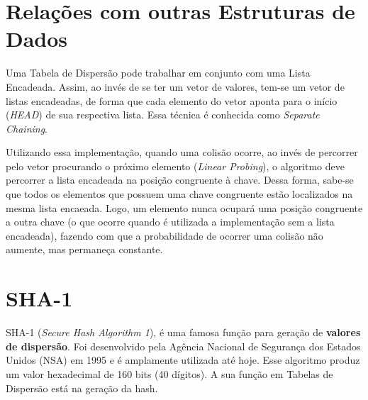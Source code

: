\documentclass[12pt,openright,oneside,a4paper,english,brazil]{abntex2}
\begin{document}
\section*{Relações com outras Estruturas de Dados}
    Uma Tabela de Dispersão pode trabalhar em conjunto com uma Lista Encadeada. Assim, ao invés de se ter um vetor de valores, tem-se um vetor de listas encadeadas, de forma que cada elemento do vetor aponta para o início (\textit{HEAD}) de sua respectiva lista. Essa técnica é conhecida como \textit{Separate Chaining}.

    Utilizando essa implementação, quando uma colisão ocorre, ao invés de percorrer pelo vetor procurando o próximo elemento (\textit{Linear Probing}), o algoritmo deve percorrer a lista encadeada na posição congruente à chave.
    Dessa forma, sabe-se que todos os elementos que possuem uma chave congruente estão localizados na mesma lista encaeada. Logo, um elemento nunca ocupará uma posição congruente a outra chave (o que ocorre quando é utilizada a implementação sem a lista encadeada), fazendo com que a probabilidade de ocorrer uma colisão não aumente, mas permaneça constante.

\section*{SHA-1}
    SHA-1 (\textit{Secure Hash Algorithm 1}), é uma famosa função para geração de \textbf{valores de dispersão}.
    Foi desenvolvido pela Agência Nacional de Segurança dos Estados Unidos (NSA) em 1995 e é amplamente utilizada até hoje.
    Esse algoritmo produz um valor hexadecimal de 160 bits (40 dígitos).
    A sua função em Tabelas de Dispersão está na geração da hash.
\end{document}
